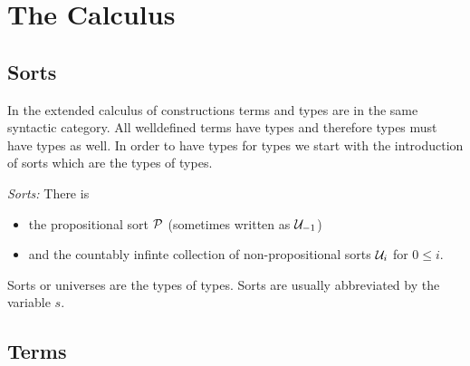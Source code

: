\section{The Calculus}






\subsection{Sorts}


In the extended calculus of constructions terms and types are in the same
syntactic category. All welldefined terms have types and therefore types must
have types as well. In order to have types for types we start with the
introduction of sorts which are the types of types.

\begin{definition}
    \emph{Sorts:}
    There is
    \begin{itemize}
        \item the propositional sort ${\cal P}$ (sometimes written as ${\cal U}_{-1}$)
    \item and the countably infinte collection of
    non-propositional sorts ${\cal U}_i$ for $0 \le i$.
    \end{itemize}

    Sorts or universes are the types of types. Sorts are usually abbreviated by
    the variable $s$.
\end{definition}





\subsection{Terms}

